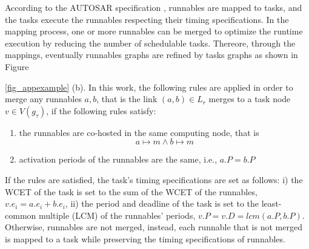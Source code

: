 According to the AUTOSAR specification \cite{AUTOSAR2017SpecificationSoftware}, runnables are mapped to tasks, and the tasks execute the runnables respecting their timing specifications. In the mapping process, one or more runnables can be merged to optimize the runtime execution by reducing the number of schedulable tasks. Thereore, through the mappings, eventually runnables graphs are refined by tasks graphs as shown in Figure{\ref{fig_appexample} (b). In this work, the following rules are applied in order to merge any runnables $a,b$, that is the link $(a, b)\in L_r$ merges to a task node $v\in V(g_\tau)$, if the following rules satisfy:
\begin{enumerate}[label=(\roman*)]
\item the runnables are co-hosted in the same computing node, that is \[a\mapsto m \land b\mapsto m\]
\item activation periods of the runnables are the same, i.e., $a.P = b.P$
\end{enumerate}

If the rules are satisfied, the task's timing specifications are set as follows: i) the WCET of the task is set to the sum of the WCET of the runnables, $v.e_i=a.e_i + b.e_i$, ii) the period and deadline of the task is  set to the least-common multiple (LCM) of the runnables' periods, $v.P=v.D=lcm(a.P, b.P)$. Otherwise, runnables are not merged, instead, each runnable that is not merged is mapped to a task while preserving the timing specifications of runnables.



}

